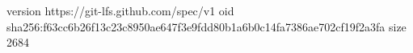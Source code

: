 version https://git-lfs.github.com/spec/v1
oid sha256:f63cc6b26f13c23c8950ae647f3e9fdd80b1a6b0c14fa7386ae702cf19f2a3fa
size 2684
